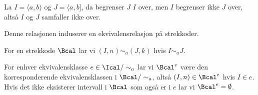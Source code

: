 \begin{bemerk}
  La $I = \langle a,b)$ og $J = \langle a,b]$, da
  begrenser $J$ $I$ over, men $I$ begrenser ikke $J$ over,
  altså $I$ og $J$ samfaller ikke over.
\end{bemerk}

Denne relasjonen induserer en ekvivalensrelasjon på
strekkoder.

\begin{definisjon}\label{def:EkRelBarc}
  For en strekkode $\Bcal$ lar vi $(I,n)\sim_a (J,k)$ hvis
  $I\sim_a J$.
\end{definisjon}

For enhver ekvivalensklasse $e\in\Ical/\sim_a$ lar vi
$\Bcal^e$ være den korresponderende ekvivalensklassen
i $\Bcal/\sim_a$, altså $(I,n)\in\Bcal^e$ hvis $I\in e$.
Hvis det ikke eksisterer intervall i $\Bcal$ som også er
i $e$ lar vi $\Bcal^e=\emptyset$.
